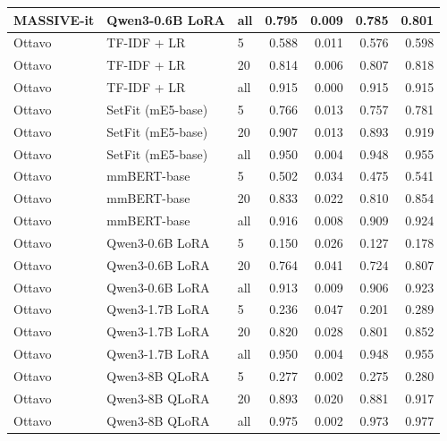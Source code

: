 \begin{tabular}{lllrrrr}
MASSIVE-it & Qwen3-0.6B LoRA & all & 0.795 & 0.009 & 0.785 & 0.801 \\
\midrule
Ottavo & TF-IDF + LR & 5 & 0.588 & 0.011 & 0.576 & 0.598 \\
Ottavo & TF-IDF + LR & 20 & 0.814 & 0.006 & 0.807 & 0.818 \\
Ottavo & TF-IDF + LR & all & 0.915 & 0.000 & 0.915 & 0.915 \\
Ottavo & SetFit (mE5-base) & 5 & 0.766 & 0.013 & 0.757 & 0.781 \\
Ottavo & SetFit (mE5-base) & 20 & 0.907 & 0.013 & 0.893 & 0.919 \\
Ottavo & SetFit (mE5-base) & all & 0.950 & 0.004 & 0.948 & 0.955 \\
Ottavo & mmBERT-base & 5 & 0.502 & 0.034 & 0.475 & 0.541 \\
Ottavo & mmBERT-base & 20 & 0.833 & 0.022 & 0.810 & 0.854 \\
Ottavo & mmBERT-base & all & 0.916 & 0.008 & 0.909 & 0.924 \\
Ottavo & Qwen3-0.6B LoRA & 5 & 0.150 & 0.026 & 0.127 & 0.178 \\
Ottavo & Qwen3-0.6B LoRA & 20 & 0.764 & 0.041 & 0.724 & 0.807 \\
Ottavo & Qwen3-0.6B LoRA & all & 0.913 & 0.009 & 0.906 & 0.923 \\
Ottavo & Qwen3-1.7B LoRA & 5 & 0.236 & 0.047 & 0.201 & 0.289 \\
Ottavo & Qwen3-1.7B LoRA & 20 & 0.820 & 0.028 & 0.801 & 0.852 \\
Ottavo & Qwen3-1.7B LoRA & all & 0.950 & 0.004 & 0.948 & 0.955 \\
Ottavo & Qwen3-8B QLoRA & 5 & 0.277 & 0.002 & 0.275 & 0.280 \\
Ottavo & Qwen3-8B QLoRA & 20 & 0.893 & 0.020 & 0.881 & 0.917 \\
Ottavo & Qwen3-8B QLoRA & all & 0.975 & 0.002 & 0.973 & 0.977 \\
\bottomrule
\end{tabular}